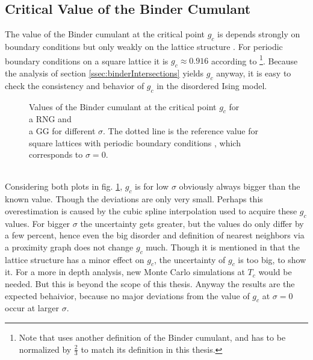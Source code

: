 \subsection{Critical Value of the Binder Cumulant}
    The value of the Binder cumulant at the critical point \(g_c\) is
    depends strongly on boundary conditions but only weakly on the lattice
    structure \cite{BinderValue}. For periodic boundary conditions on a
    square lattice it is \(g_c \approx 0.916\) according to \cite{BinderValue}
        \footnote{Note that \cite{BinderValue} uses another definition of
            the Binder cumulant, and has to be normalized by \(\frac{2}{3}\)
            to match its definition in this thesis.}.
    Because the analysis of section \ref{ssec:binderIntersections}
    yields \(g_c\) anyway, it is easy to check the consistency and
    behavior of \(g_c\) in the disordered Ising model.\\
    \begin{figure}[htbp]
        \centering
        \caption[Values of the Binder Cumulant at the Critical Point $g_c$]
        {
            Values of the Binder cumulant at the critical point \(g_c\)
            for\\
             a RNG and\\
             a GG for different \(\sigma\).
            The dotted line is the reference value for square lattices
            with periodic boundary conditions \cite{BinderValue}, which
            corresponds to \(\sigma = 0\).
        }
        \label{fig:TcG}
    \end{figure}\\
    Considering both plots in fig. \ref{fig:TcG}, \(g_c\) is for low
    \(\sigma\) obviously always bigger than the known value. Though the
    deviations are only very small. Perhaps this overestimation is caused
    by the cubic spline interpolation used to acquire these \(g_c\) values.
    For bigger \(\sigma\) the uncertainty gets greater, but the values
    do only differ by a few percent, hence even the big disorder and
    definition of nearest neighbors via a proximity graph does not change
    \(g_c\) much. Though it is mentioned in \cite{BinderValue} that the
    lattice structure has a minor effect on \(g_c\), the uncertainty of
    \(g_c\) is too big, to show it. For a more in depth analysis, new
    Monte Carlo simulations at \(T_c\) would be needed. But this is
    beyond the scope of this thesis. Anyway the results are the expected
    behaivior, because no major deviations from the value of \(g_c\) at
    \(\sigma = 0\) occur at larger \(\sigma\).

